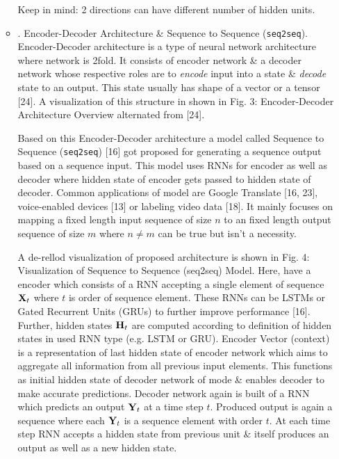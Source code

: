 \documentclass{article}
\begin{document}
\begin{enumerate}
\begin{itemize}
		Keep in mind: 2 directions can have different number of hidden units.		
		\item {. Encoder-Decoder Architecture \& Sequence to Sequence ({\tt seq2seq}).} Encoder-Decoder architecture is a type of neural network architecture where network is 2fold. It consists of encoder network \& a decoder network whose respective roles are to {\it encode} input into a state \& {\it decode} state to an output. This state usually has shape of a vector or a tensor [24]. A visualization of this structure in shown in {\sf Fig. 3: Encoder-Decoder Architecture Overview alternated from [24]}.
		
		Based on this Encoder-Decoder architecture a model called Sequence to Sequence ({\tt seq2seq}) [16] got proposed for generating a sequence output based on a sequence input. This model uses RNNs for encoder as well as decoder where hidden state of encoder gets passed to hidden state of decoder. Common applications of model are Google Translate [16, 23], voice-enabled devices [13] or labeling video data [18]. It mainly focuses on mapping a fixed length input sequence of size $n$ to an fixed length output sequence of size $m$ where $n\ne m$ can be true but isn't a necessity.
		
		A de-rellod visualization of proposed architecture is shown in {\sf Fig. 4: Visualization of Sequence to Sequence (seq2seq) Model.} Here, have a encoder which consists of a RNN accepting a single element of sequence ${\bf X}_t$ where $t$ is order of sequence element. These RNNs can be LSTMs or Gated Recurrent Units (GRUs) to further improve performance [16]. Further, hidden states ${\bf H}_t$ are computed according to definition of hidden states in used RNN type (e.g. LSTM or GRU). Encoder Vector (context) is a representation of last hidden state of encoder network which aims to aggregate all information from all previous input elements. This functions as initial hidden state of decoder network of mode \& enables decoder to make accurate predictions. Decoder network again is built of a RNN which predicts an output ${\bf Y}_t$ at a time step $t$. Produced output is again a sequence where each ${\bf Y}_t$ is a sequence element with order $t$. At each time step RNN accepts a hidden state from previous unit \& itself produces an output as well as a new hidden state.
		

\end{itemize}
\end{enumerate}
\end{document}
